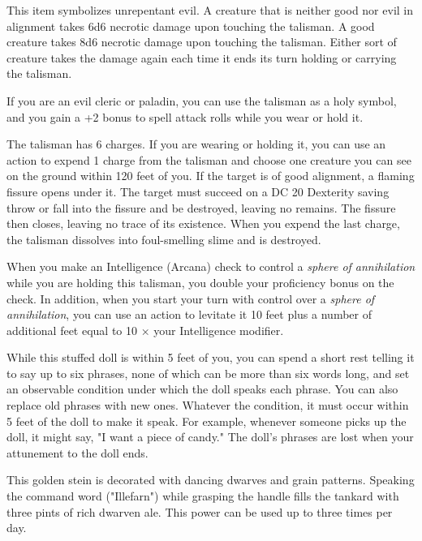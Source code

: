 \documentclass[10pt,a4paper,twoside,bg=print,twocolumn,openany,nodeprecatedcode]{dndbook}
\begin{document}
This item symbolizes unrepentant evil. A creature that is neither good nor evil in alignment takes 6d6 necrotic damage upon touching the talisman. A good creature takes 8d6 necrotic damage upon touching the talisman. Either sort of creature takes the damage again each time it ends its turn holding or carrying the talisman.

If you are an evil cleric or paladin, you can use the talisman as a holy symbol, and you gain a +2 bonus to spell attack rolls while you wear or hold it.

The talisman has 6 charges. If you are wearing or holding it, you can use an action to expend 1 charge from the talisman and choose one creature you can see on the ground within 120 feet of you. If the target is of good alignment, a flaming fissure opens under it. The target must succeed on a DC 20 Dexterity saving throw or fall into the fissure and be destroyed, leaving no remains. The fissure then closes, leaving no trace of its existence. When you expend the last charge, the talisman dissolves into foul-smelling slime and is destroyed.

When you make an Intelligence (Arcana) check to control a \textit{sphere of annihilation} while you are holding this talisman, you double your proficiency bonus on the check. In addition, when you start your turn with control over a \textit{sphere of annihilation}, you can use an action to levitate it 10 feet plus a number of additional feet equal to 10 × your Intelligence modifier.

While this stuffed doll is within 5 feet of you, you can spend a short rest telling it to say up to six phrases, none of which can be more than six words long, and set an observable condition under which the doll speaks each phrase. You can also replace old phrases with new ones. Whatever the condition, it must occur within 5 feet of the doll to make it speak. For example, whenever someone picks up the doll, it might say, "I want a piece of candy." The doll's phrases are lost when your attunement to the doll ends.

This golden stein is decorated with dancing dwarves and grain patterns. Speaking the command word ("Illefarn") while grasping the handle fills the tankard with three pints of rich dwarven ale. This power can be used up to three times per day.
\end{document}
